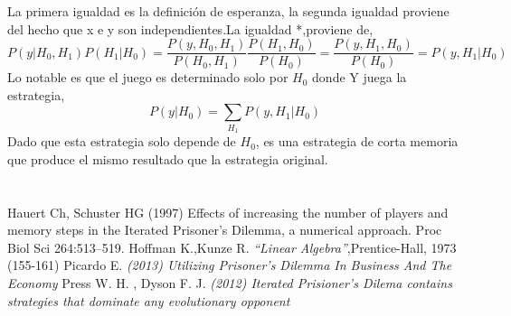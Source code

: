 \documentclass[12pt]{article}
\begin{document}
La primera igualdad es la definición de esperanza, la segunda igualdad proviene del hecho que x e y son independientes.La 
igualdad *,proviene de,
$$P(y|H_0,H_1)P(H_1|H_0)=\frac{P(y,H_0,H_1)}{P(H_0,H_1)} \frac{P(H_1,H_0)}{P(H_0)}=\frac{P(y,H_1,H_0)}{P(H_0)}=P(y,H_1|H_0)$$
Lo notable es que el juego es determinado solo por $H_0$ donde Y juega la estrategia,
$$P(y|H_0)=\sum_{H_1}P(y,H_1|H_0)$$
Dado que esta estrategia solo depende de $H_0$, es una estrategia de corta memoria que produce el mismo
resultado que la estrategia original.


\newpage
 \section{}
  \begin{thebibliography}{1}
   Hauert Ch, Schuster HG (1997) Effects of increasing the number of players and memory steps in the Iterated Prisoner’s Dilemma, a numerical approach. Proc Biol Sci 264:513–519.
    Hoffman K.,Kunze R.  \emph{``Linear Algebra''},Prentice-Hall, 1973 (155-161)
    Picardo E. {\em (2013) Utilizing Prisoner’s Dilemma In Business And The Economy }
    Press W. H. , Dyson F. J.  {\em (2012) Iterated Prisioner's Dilema contains strategies that dominate any evolutionary opponent}  
  \end{thebibliography}
\end{document}

